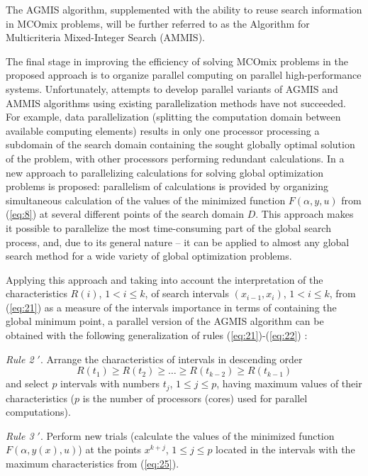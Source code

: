 \documentclass{svproc}
\begin{document}
The AGMIS algorithm, supplemented with the ability to reuse search information in MCOmix problems, will be further referred to as the Algorithm for Multicriteria Mixed-Integer Search (AMMIS).

The final stage in improving the efficiency of solving MCOmix problems in the proposed approach is to organize parallel computing on parallel high-performance systems. Unfortunately, attempts to develop parallel variants of AGMIS and AMMIS algorithms using existing parallelization methods have not succeeded. For example, data parallelization (splitting the computation domain between available computing elements) results in only one processor processing a subdomain of the search domain  containing the sought globally optimal solution of the problem, with other processors performing redundant calculations.  In \cite{c24,c32} a new approach to parallelizing calculations for solving global optimization problems is proposed: parallelism of calculations is provided by organizing simultaneous calculation of the values of the minimized function $F(\alpha,y,u)$ from (\ref{eq:8}) at several different points of the search domain $D$. This approach makes it possible to parallelize the most time-consuming part of the global search process, and, due to its general nature -- it can be applied to almost any global search method for a wide variety of global optimization problems.

Applying this approach and taking into account the interpretation of the characteristics $R(i)$, $1<i \leq k$, of search intervals $(x_{i-1}, x_i)$, $1<i \leq k$, from (\ref{eq:21}) as a measure of the intervals importance in terms of containing the global minimum point, a parallel version of the AGMIS algorithm can be obtained with the following generalization of rules (\ref{eq:21})-(\ref{eq:22}) \cite{c32,c40}:

\textit{Rule 2 $'$}. Arrange the characteristics of intervals in descending order
\begin{equation}\label{eq:25}
 R(t_1) \geq R(t_2) \geq \dots \geq R(t_{k-2}) \geq R(t_{k-1})
\end{equation}
and select $p$ intervals with numbers $t_j$, $1 \leq j \leq p$, having maximum values of their characteristics ($p$ is the number of processors (cores) used for parallel computations).

\textit{Rule 3 $'$}. Perform new trials (calculate the values of the minimized function $F(\alpha,y(x),u)$) at the points $x^{k+j}$, $1 \leq j \leq p$ located in the intervals with the maximum characteristics from (\ref{eq:25}).
\end{document}
